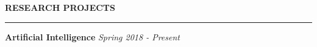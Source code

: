 \documentclass[10pt,letterpaper]{article}
\newenvironment{mysection}[1]{ %
  \medskip
  \MakeUppercase{\bf #1}
  \medskip
  \hrule
  \medskip
  \begin{list}{}{
      \setlength{\leftmargin}{1.5em}
    }
  \item[]
}{
  \end{list}
}
\begin{document}
\begin{mysection}{Research Projects}



  
  \textbf{Artificial Intelligence} \hfill \emph{Spring 2018 - Present}



\end{mysection}
\end{document}
